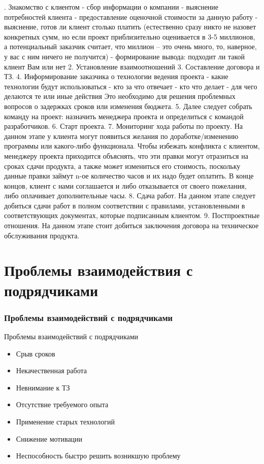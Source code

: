 \documentclass{../industrial-development}
\begin{document}
. Знакомство с клиентом
  - сбор информации о компании
  -  выяснение потребностей клиента
  - предоставление оценочной стоимости за данную работу
 -  выяснение, готов ли клиент столько платить (естественно сразу никто не назовет конкретных сумм, но если проект приблизительно оценивается в 3-5 миллионов, а потенциальный заказчик считает, что миллион –  это очень много, то, наверное, у вас с ним ничего не получится)
  - формирование вывода: подходит ли такой клиент Вам или нет
2. Установление взаимоотношений
3. Составление договора и ТЗ.
4. Информирование заказчика о технологии ведения проекта
 - какие технологии будут использоваться
 - кто за что отвечает
 - кто что делает
 - для чего делаются те или иные действия
 Это необходимо для решения проблемных вопросов о задержках сроков или изменения бюджета.
5. Далее следует собрать команду на проект: назначить менеджера проекта и определиться с командой разработчиков.
6. Старт проекта.
7. Мониторинг хода работы по проекту. 
На данном этапе у клиента могут появиться желания по доработке/изменению программы или какого-либо функционала. Чтобы избежать конфликта с клиентом, менеджеру проекта приходится объяснять, что эти правки могут отразиться на сроках сдачи продукта, а также может измениться его стоимость, поскольку данные правки займут n-ое количество часов и их надо будет оплатить. В конце концов, клиент с нами соглашается и либо отказывается от своего пожелания, либо оплачивает дополнительные часы. 
8. Сдача работ.
На данном этапе следует добиться сдачи работ в полном соответствии с правилами, установленными в соответствующих документах, которые подписанным клиентом.
9. Постпроектные отношения. 
На данном этапе стоит добиться заключения договора на техническое обслуживания продукта.

\section{Проблемы взаимодействия с подрядчиками}
\begin{frame} \frametitle{Проблемы взаимодействий с подрядчиками}
  \begin{block}{Проблемы взаимодействий с подрядчиками}
  \end{block}

\begin{itemize}
 \item Срыв сроков 
 \item Некачественная работа
 \item Невнимание к ТЗ
 \item Отсутствие требуемого опыта
 \item Применение старых технологий
 \item Снижение мотивации
 \item Неспособность быстро решить возникшую проблему
  \end{itemize}
\end{frame}
\end{document}
